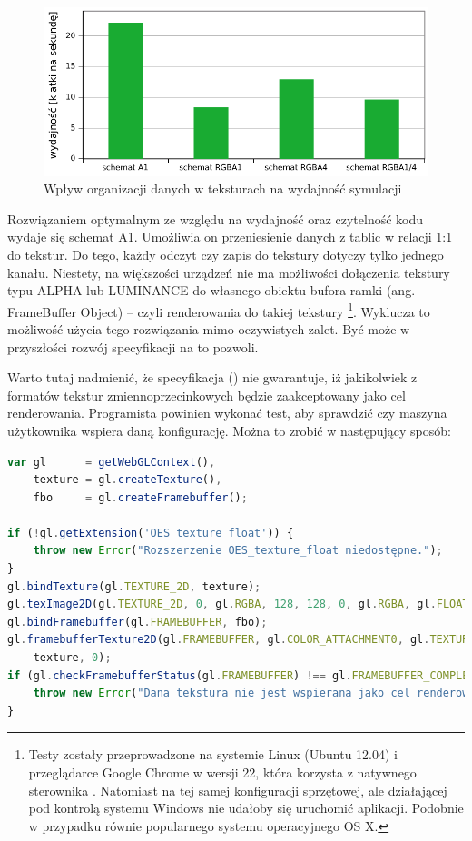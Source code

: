 \begin{figure}[!h]
\centering
\includegraphics[width=.9\textwidth]{img/texPerf}
\caption{Wpływ organizacji danych w teksturach na wydajność symulacji 
}
\label{fig:texPerf}
\end{figure}

Rozwiązaniem optymalnym ze względu na wydajność oraz czytelność kodu wydaje się
schemat A1. Umożliwia on przeniesienie danych z tablic w relacji 1:1 do tekstur.
Do tego, każdy odczyt czy zapis do tekstury dotyczy tylko jednego kanału.
Niestety, na większości urządzeń nie ma możliwości dołączenia tekstury typu
ALPHA lub LUMINANCE do własnego obiektu bufora ramki (ang. FrameBuffer Object)
-- czyli renderowania do takiej tekstury \footnote{Testy zostały przeprowadzone
na systemie Linux (Ubuntu 12.04) i przeglądarce Google Chrome w wersji 22, która
korzysta z natywnego sterownika . Natomiast na tej samej konfiguracji
sprzętowej, ale działającej pod kontrolą systemu Windows nie udałoby się
uruchomić aplikacji. Podobnie w przypadku równie popularnego systemu
operacyjnego OS X.}. Wyklucza to możliwość użycia tego rozwiązania mimo
oczywistych zalet. Być może w przyszłości rozwój specyfikacji  na to
pozwoli.

Warto tutaj nadmienić, że specyfikacja  (\cite{WebGLSpec}) nie
gwarantuje, iż jakikolwiek z formatów tekstur zmiennoprzecinkowych będzie
zaakceptowany jako cel renderowania. Programista powinien wykonać test, aby
sprawdzić czy maszyna użytkownika wspiera daną konfigurację. Można to zrobić w
następujący sposób:

\begin{lstlisting}[language=JavaScript, caption=Weryfikacja poprawności formatu
i typu tekstury używanej jako cel renderowania]
var gl 		= getWebGLContext(),
	texture = gl.createTexture(),
	fbo 	= gl.createFramebuffer();

if (!gl.getExtension('OES_texture_float')) {
	throw new Error("Rozszerzenie OES_texture_float niedostępne.");
}
gl.bindTexture(gl.TEXTURE_2D, texture);
gl.texImage2D(gl.TEXTURE_2D, 0, gl.RGBA, 128, 128, 0, gl.RGBA, gl.FLOAT, null);
gl.bindFramebuffer(gl.FRAMEBUFFER, fbo);
gl.framebufferTexture2D(gl.FRAMEBUFFER, gl.COLOR_ATTACHMENT0, gl.TEXTURE_2D, 
	texture, 0);
if (gl.checkFramebufferStatus(gl.FRAMEBUFFER) !== gl.FRAMEBUFFER_COMPLETE) {
	throw new Error("Dana tekstura nie jest wspierana jako cel renderowania.");
}
\end{lstlisting}


